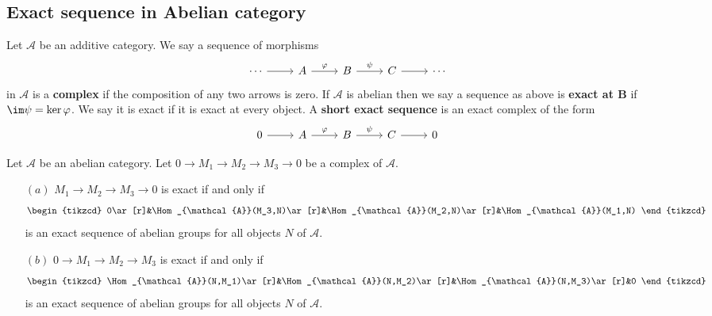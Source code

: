 \subsection{Exact sequence in Abelian category}
\begin{definition}
Let $\mathcal{A}$ be an additive category. We say a sequence of morphisms
\[\begin{tikzcd}
\cdots\ar[r]&A\ar[r,"\varphi"]&B\ar[r,"\psi"]&C\ar[r]&\cdots
\end{tikzcd}\]
in $\mathcal{A}$ is a \textbf{complex} if the composition of any two arrows is zero. If $\mathcal{A}$ is abelian then we say a sequence as above is \textbf{exact at $\bm{B}$} if $\im\psi=\ker\varphi$. We say it is exact if it is exact at every object. A \textbf{short exact sequence} is an exact complex of the form
\[\begin{tikzcd}
0\ar[r]&A\ar[r,"\varphi"]&B\ar[r,"\psi"]&C\ar[r]&0
\end{tikzcd}\]
\end{definition}
\begin{proposition}
Let $\mathcal{A}$ be an abelian category. Let $0\to M_1\to M_2\to M_3\to0$ be a complex of $\mathcal{A}$.
\begin{itemize}
\item[$(a)$] $M_1\to M_2\to M_3\to 0$ is exact if and only if
\[\begin{tikzcd}
0\ar[r]&\Hom_{\mathcal{A}}(M_3,N)\ar[r]&\Hom_{\mathcal{A}}(M_2,N)\ar[r]&\Hom_{\mathcal{A}}(M_1,N)
\end{tikzcd}\]
is an exact sequence of abelian groups for all objects $N$ of $\mathcal{A}$.
\item[$(b)$] $0\to M_1\to M_2\to M_3$ is exact if and only if
\[\begin{tikzcd}
\Hom_{\mathcal{A}}(N,M_1)\ar[r]&\Hom_{\mathcal{A}}(N,M_2)\ar[r]&\Hom_{\mathcal{A}}(N,M_3)\ar[r]&0
\end{tikzcd}\]
is an exact sequence of abelian groups for all objects $N$ of $\mathcal{A}$.
\end{itemize}
\end{proposition}
